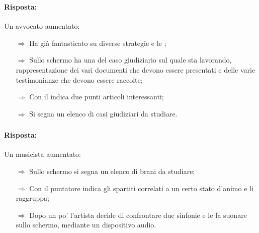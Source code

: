 \subsubsection{}


\paragraph{Risposta:} Un avvocato aumentato:

\begin{itemize}
    \item [$\Rightarrow$] Ha già fantasticato su diverse strategie e le ;
    \item [$\Rightarrow$] Sullo schermo ha una  del caso giudiziario sul
    quale sta lavorando, rappresentazione dei vari documenti che devono essere presentati e delle varie
    testimonianze che devono essere raccolte;
    \item [$\Rightarrow$] Con il  indica due punti articoli interessanti;
    \item [$\Rightarrow$] Si segna un elenco di casi giudiziari da studiare.
\end{itemize}

\subsubsection{}


\paragraph{Risposta:} Un musicista aumentato:

\begin{itemize}
    \item [$\Rightarrow$] Sullo schermo si segna un elenco di brani da studiare;
    \item [$\Rightarrow$] Con il puntatore indica gli spartiti correlati a un certo stato d'animo e li raggruppa;
    \item [$\Rightarrow$] Dopo un po' l'artista decide di confrontare due sinfonie e le fa suonare sullo schermo, mediante un dispositivo audio.
\end{itemize}

